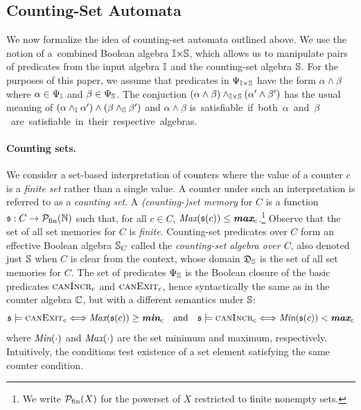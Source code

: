 \documentclass[acmsmall,screen]{acmart}
\begin{document}
\subsection{Counting-Set Automata}
\label{sec:CsA}

We now formalize the idea of counting-set automata outlined above.  We
use the notion of a~combined Boolean algebra $\mathbb{I}{\times}\mathbb{S}$, which allows us to
manipulate pairs of predicates from the input algebra $\mathbb{I}$ and the
counting-set algebra $\mathbb{S}$. For the purposes of this paper, we assume
that predicates in $\Psi_{\mathbb{I}{\times}\mathbb{S}}$ have the form $\alpha\wedge\beta$
where $\alpha\in\Psi_{\mathbb{I}}$ and $\beta\in\Psi_{\mathbb{S}}$. The conjuction
$(\alpha\wedge\beta)\wedge_{\mathbb{I}{\times}\mathbb{S}}(\alpha'\wedge\beta')$ has the usual meaning
of $(\alpha\wedge_{\mathbb{I}}\alpha')\wedge(\beta\wedge_{\mathbb{S}}\beta')$ and
$\alpha\wedge\beta$ \mbox{is satisfiable if both $\alpha$ and $\beta$ are
satisfiable in their respective algebras.}

\paragraph{Counting sets.}

We consider a set-based interpretation of counters where the value of a counter
$c$ is a \emph{finite set} rather than a single value. 
%
A counter under such an interpretation is referred to as a \emph{counting set}.
%
A \emph{(counting-)set memory} for $C$ is a function $\mathfrak{s} : C \rightarrow
\mathcal{P}_{\text{fin}}(\mathbb{N})$ such that, for all $c\in C$, $\textit{Max}(\mathfrak{s}(c)) \leq
\textit{\textbf{max}}_{c}$.\footnote{We write $\mathcal{P}_{\text{fin}}(X)$ for the powerset of $X$ restricted
to finite nonempty sets.}
%
Observe that the set of all set memories for $C$ is \emph{finite}.
%
Counting-set predicates over $C$ form an effective Boolean algebra $\mathbb{S}_C$ called
the \emph{counting-set algebra over $C$}, 
also denoted just $\mathbb{S}$ when $C$ is clear from the context, 
whose domain $\mathfrak{D}_{\mathbb{S}}$ is the set
of all set memories for $C$.
%
The set of predicates $\Psi_{\mathbb{S}}$ is the Boolean closure of the basic
predicates $\textsc{canIncr}_{c}$ and $\textsc{canExit}_{c}$, hence syntactically the same as in
the counter algebra $\mathbb{C}$, but with a different semantics under $\mathbb{S}$:
%
$$\mathfrak{s}\models \textsc{canExit}_{c} \Longleftrightarrow \textit{Max}(\mathfrak{s}(c)) \geq \textit{\textbf{min}}_{c}
\quad\textrm{and}\quad \mathfrak{s}\models\textsc{canIncr}_{c}\Longleftrightarrow \textit{Min}(\mathfrak{s}(c)) < \textit{\textbf{max}}_{c}$$
where $\textit{Min}(\cdot)$ and $\textit{Max}(\cdot)$ are the set minimum and maximum,
respectively. 
%
Intuitively, the conditions test existence of a set element satisfying the same counter condition.
\end{document}
